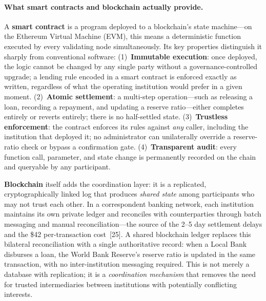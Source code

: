 \documentclass[12pt,a4paper]{report}
\begin{document}
\paragraph{What smart contracts and blockchain actually provide.}
A \textbf{smart contract} is a program deployed to a blockchain's state machine---on the Ethereum Virtual Machine (EVM), this means a deterministic function executed by every validating node simultaneously. Its key properties distinguish it sharply from conventional software: (1)~\textbf{Immutable execution}: once deployed, the logic cannot be changed by any single party without a governance-controlled upgrade; a lending rule encoded in a smart contract is enforced exactly as written, regardless of what the operating institution would prefer in a given moment. (2)~\textbf{Atomic settlement}: a multi-step operation---such as releasing a loan, recording a repayment, and updating a reserve ratio---either completes entirely or reverts entirely; there is no half-settled state. (3)~\textbf{Trustless enforcement}: the contract enforces its rules against \textit{any} caller, including the institution that deployed it; no administrator can unilaterally override a reserve-ratio check or bypass a confirmation gate. (4)~\textbf{Transparent audit}: every function call, parameter, and state change is permanently recorded on the chain and queryable by any participant.

\textbf{Blockchain} itself adds the coordination layer: it is a replicated, cryptographically linked log that produces \textit{shared state} among participants who may not trust each other. In a correspondent banking network, each institution maintains its own private ledger and reconciles with counterparties through batch messaging and manual reconciliation---the source of the 2--5 day settlement delays and the \$42 per-transaction cost~[25]. A shared blockchain ledger replaces this bilateral reconciliation with a single authoritative record: when a Local Bank disburses a loan, the World Bank Reserve's reserve ratio is updated in the same transaction, with no inter-institution messaging required. This is not merely a database with replication; it is a \textit{coordination mechanism} that removes the need for trusted intermediaries between institutions with potentially conflicting interests.
\end{document}

